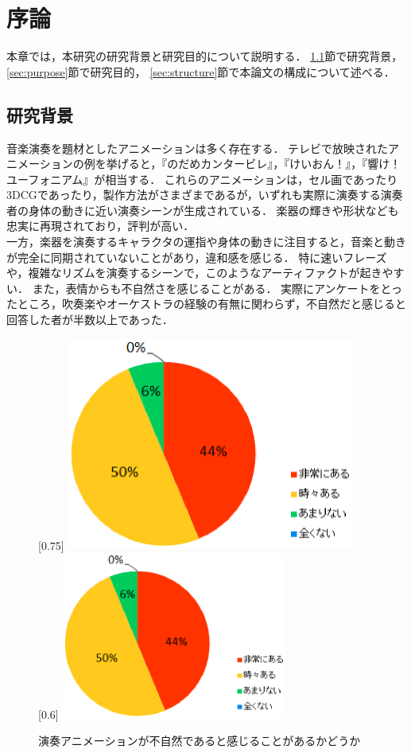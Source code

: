 \chapter{序論}
\label{chap:intro}

本章では，本研究の研究背景と研究目的について説明する．
\ref{sec:background}節で研究背景，
\ref{sec:purpose}節で研究目的，
\ref{sec:structure}節で本論文の構成について述べる．

\section{研究背景}\label{sec:background}
\indent
音楽演奏を題材としたアニメーションは多く存在する．
テレビで放映されたアニメーションの例を挙げると，『のだめカンタービレ』，『けいおん！』，『響け！ユーフォニアム』が相当する．
これらのアニメーションは，セル画であったり3DCGであったり，製作方法がさまざまであるが，いずれも実際に演奏する演奏者の身体の動きに近い演奏シーンが生成されている．
楽器の輝きや形状なども忠実に再現されており，評判が高い．\\
\indent
一方，楽器を演奏するキャラクタの運指や身体の動きに注目すると，音楽と動きが完全に同期されていないことがあり，違和感を感じる．
特に速いフレーズや，複雑なリズムを演奏するシーンで，このようなアーティファクトが起きやすい．
また，表情からも不自然さを感じることがある．
実際にアンケートをとったところ，吹奏楽やオーケストラの経験の有無に関わらず，不自然だと感じると回答した者が半数以上であった．

\begin{figure}[t]
	\centering
	[0.75\linewidth]{
		\includegraphics[height=7cm]{fig/chap1/Q1-1.eps}}
	[0.6\linewidth]{
		\includegraphics[height=5.5cm]{fig/chap1/Q1-2.eps}}
	\caption{演奏アニメーションが不自然であると感じることがあるかどうか}
	\label{fig:model}
\end{figure}


